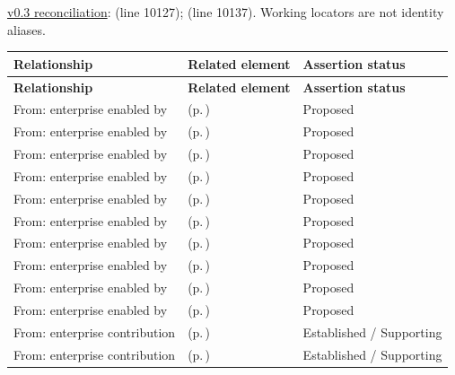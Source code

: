 \hyperref[model:reconciliation]{v0.3 reconciliation}: \texttt{} (line 10127); \texttt{} (line 10137). Working locators are not identity aliases.
\begingroup\small\setlength{\TableWidth}{\dimexpr\linewidth-6\tabcolsep-4\arrayrulewidth\relax}
\begin{longtable}{|>{\raggedright\arraybackslash}p{0.27\TableWidth}|>{\raggedright\arraybackslash}p{0.48\TableWidth}|>{\raggedright\arraybackslash}p{0.25\TableWidth}|}
\hline\rowcolor{TableHead}\textbf{Relationship} & \textbf{Related element} & \textbf{Assertion status}\\\hline\endfirsthead
\hline\rowcolor{TableHead}\textbf{Relationship} & \textbf{Related element} & \textbf{Assertion status}\\\hline\endhead
\hline\endfoot
From: enterprise enabled by & \nameref{cap:bec-person-identity} (p.\,\pageref{cap:bec-person-identity}) & Proposed\\\hline
From: enterprise enabled by & \nameref{cap:bec-healthcare-subject} (p.\,\pageref{cap:bec-healthcare-subject}) & Proposed\\\hline
From: enterprise enabled by & \nameref{cap:bec-provider-administration} (p.\,\pageref{cap:bec-provider-administration}) & Proposed\\\hline
From: enterprise enabled by & \nameref{cap:bec-organisation-administration} (p.\,\pageref{cap:bec-organisation-administration}) & Proposed\\\hline
From: enterprise enabled by & \nameref{cap:bec-location-administration} (p.\,\pageref{cap:bec-location-administration}) & Proposed\\\hline
From: enterprise enabled by & \nameref{cap:bec-health-service-administration} (p.\,\pageref{cap:bec-health-service-administration}) & Proposed\\\hline
From: enterprise enabled by & \nameref{cap:bec-clinical-device-administration} (p.\,\pageref{cap:bec-clinical-device-administration}) & Proposed\\\hline
From: enterprise enabled by & \nameref{cap:bec-health-information-access} (p.\,\pageref{cap:bec-health-information-access}) & Proposed\\\hline
From: enterprise enabled by & \nameref{cap:bec-clinical-knowledge-services} (p.\,\pageref{cap:bec-clinical-knowledge-services}) & Proposed\\\hline
From: enterprise enabled by & \nameref{cap:bec-on-call-management} (p.\,\pageref{cap:bec-on-call-management}) & Proposed\\\hline
From: enterprise contribution & \nameref{cap:bec-assurance-design} (p.\,\pageref{cap:bec-assurance-design}) & Established / Supporting\\\hline
From: enterprise contribution & \nameref{cap:bec-assurance-criteria-management} (p.\,\pageref{cap:bec-assurance-criteria-management}) & Established / Supporting\\\hline
\end{longtable}\endgroup


